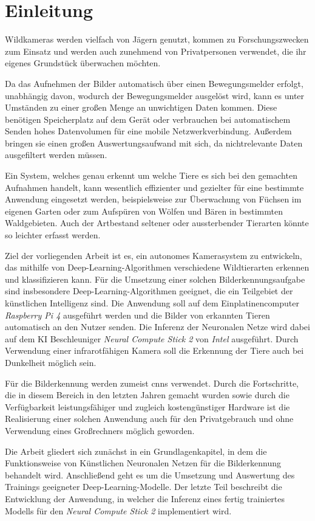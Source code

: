 \chapter{Einleitung}\label{kap:einleitung}


Wildkameras werden vielfach von Jägern genutzt, kommen
 zu Forschungszwecken zum Einsatz und werden auch
  zunehmend von Privatpersonen verwendet, die ihr eigenes
   Grundstück überwachen möchten.

Da das Aufnehmen der Bilder automatisch über einen
 Bewegungsmelder erfolgt, unabhängig davon, wodurch
  der Bewegungsmelder ausgelöst wird, kann es unter
   Umständen zu einer großen Menge an unwichtigen Daten
    kommen. Diese benötigen Speicherplatz auf dem Gerät
     oder verbrauchen bei automatischem Senden hohes
      Datenvolumen für eine mobile Netzwerkverbindung.
       Außerdem bringen sie einen großen Auswertungsaufwand
        mit sich, da nichtrelevante Daten ausgefiltert
         werden müssen.

Ein System, welches genau erkennt
 um welche Tiere es sich bei den gemachten
  Aufnahmen handelt, kann wesentlich effizienter 
  und gezielter für eine bestimmte Anwendung eingesetzt
   werden, beispielsweise zur Überwachung von
    Füchsen im eigenen Garten oder zum Aufspüren von
     Wölfen und Bären in bestimmten Waldgebieten.
      Auch der Artbestand seltener oder aussterbender
       Tierarten könnte so leichter erfasst werden.

Ziel der vorliegenden Arbeit ist es, ein autonomes
 Kamerasystem zu entwickeln, das mithilfe von Deep-Learning-Algorithmen
  verschiedene Wildtierarten erkennen und klassifizieren kann.
   Für die Umsetzung einer solchen Bilderkennungsaufgabe sind
    insbesondere Deep-Learning-Algorithmen geeignet,
     die ein Teilgebiet der künstlichen Intelligenz sind.
      Die Anwendung soll auf dem Einplatinencomputer
       \textit{Raspberry Pi 4} ausgeführt werden und die Bilder
        von erkannten Tieren automatisch an den Nutzer senden.
         Die Inferenz der Neuronalen Netze wird dabei auf dem
          KI Beschleuniger \textit{Neural Compute Stick 2} von \textit{Intel}
           ausgeführt. Durch Verwendung einer infrarotfähigen Kamera
            soll die Erkennung der Tiere auch bei Dunkelheit möglich sein.

Für die Bilderkennung werden zumeist \Glspl{cnn}
 verwendet. Durch die Fortschritte, die
  in diesem Bereich in den letzten Jahren gemacht wurden sowie
   durch die Verfügbarkeit leistungsfähiger und zugleich
    kostengünstiger Hardware ist die Realisierung einer
     solchen Anwendung auch für den Privatgebrauch und
      ohne Verwendung eines Großrechners möglich geworden.


Die Arbeit gliedert sich zunächst in ein Grundlagenkapitel,
 in dem die Funktionsweise von Künstlichen Neuronalen Netzen
  für die Bilderkennung behandelt wird. Anschließend
   geht es um die Umsetzung und Auswertung des Trainings
    geeigneter Deep-Learning-Modelle.
Der letzte Teil beschreibt die Entwicklung der
 Anwendung, in welcher die Inferenz eines
  fertig trainiertes Modells für den \textit{Neural
   Compute Stick 2} implementiert wird.


